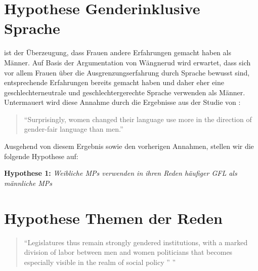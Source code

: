 \documentclass[12pt, 
    twoside=false, 
    bibliography=totoc, 
    numbers=endperiod, 
    headings=normal, 
    toc=chapterentrydotfill
    ]{scrbook}
\begin{document}
\section{Hypothese Genderinklusive Sprache}\label{kapitel:hypothese1}

\textcite*{wangnerud_2000} ist der Überzeugung, dass Frauen andere Erfahrungen gemacht haben als Männer. Auf Basis der Argumentation von Wängnerud \parencites*{wangnerud_2000}{wangnerud_2009} wird erwartet, dass sich vor allem Frauen über die Ausgrenzungserfahrung durch Sprache bewusst sind, entsprechende Erfahrungen bereits gemacht haben und daher eher eine geschlechterneutrale und geschlechtergerechte Sprache verwenden als Männer. Untermauert wird diese Annahme durch die Ergebnisse aus der Studie von \textcite{koeser_2014} :
\citereset
\begin{quote}
    \enquote {Surprisingly, women changed their language use more in the direction of gender-fair language than men.} \parencite[555]{koeser_2014}
\end{quote}

Ausgehend von diesem Ergebnis sowie den vorherigen Annahmen, stellen wir die folgende Hypothese auf: 

\textbf{Hypothese 1:} \emph{Weibliche MPs verwenden in ihren Reden häufiger GFL als männliche MPs}



\section{Hypothese Themen der Reden}\label{kapitel:hypothese2}

\begin{quote}
    \enquote{Legislatures thus remain strongly gendered institutions, with a marked division of labor between men and women politicians that becomes especially visible in the realm of social policy ” \parencite[250]{ennser-jedenastik_2017}}
\end{quote}
\end{document}

